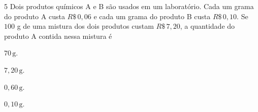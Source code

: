

\num{5}  Dois produtos químicos A e B são usados em um laboratório. Cada um grama do
produto A custa $R\$\,0,06$ e cada um grama do produto B custa
$R\$\,0,10$. Se $100$ g de uma mistura dos dois produtos custam $R\$\,7,20$, a
quantidade do produto A contida nessa mistura é

\begin{multicols}{2}
\begin{escolha}
\item $70\,\text{g}$.
\item $7,20\,\text{g}$.
\item $0,60\,\text{g}$.
\item $0,10\,\text{g}$.
\end{escolha}
\end{multicols}



